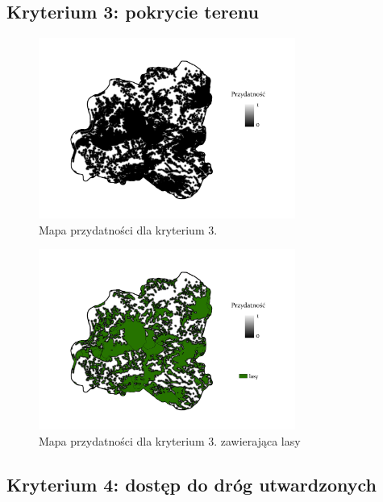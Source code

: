 \documentclass{article}
\begin{document}
\subsection{Kryterium 3: pokrycie terenu}

\begin{figure}[H]
    \centering
    \includegraphics[width=0.75\textwidth]{img/plesna-kryterium3-layout.jpg}
    \caption*{Mapa przydatności dla kryterium 3.}
\end{figure}

\begin{figure}[H]
    \centering
    \includegraphics[width=0.75\textwidth]{img/plesna-kryterium3-lasy.jpg}
    \caption*{Mapa przydatności dla kryterium 3. zawierająca lasy}
\end{figure}

\subsection{Kryterium 4: dostęp do dróg utwardzonych}
\end{document}
